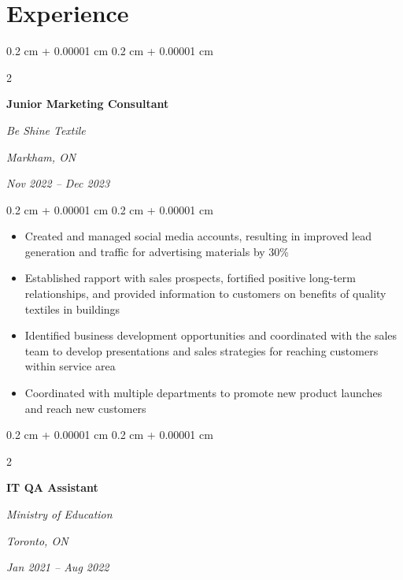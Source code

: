 \documentclass[10pt, letterpaper]{article}
\newenvironment{highlights}{
    \begin{itemize}[
        topsep=0.10 cm,
        parsep=0.10 cm,
        partopsep=0pt,
        itemsep=0pt,
        leftmargin=0.4 cm + 10pt
    ]
}{
    \end{itemize}
} %
\newenvironment{onecolentry}{
    \begin{adjustwidth}{
        0.2 cm + 0.00001 cm
    }{
        0.2 cm + 0.00001 cm
    }
}{
    \end{adjustwidth}
} %
\newenvironment{twocolentry}[2][]{
    \onecolentry
    \def\secondColumn{#2}
    \setcolumnwidth{\fill, 4.5 cm}
    \begin{paracol}{2}
}{
    \switchcolumn \raggedleft \secondColumn
    \end{paracol}
    \endonecolentry
} %
\begin{document}
    
    \section{Experience}



        
        \begin{twocolentry}{
        \textit{Markham, ON}    
            
        \textit{Nov 2022 – Dec 2023}}
            \textbf{Junior Marketing Consultant}
            
            \textit{Be Shine Textile}
        \end{twocolentry}

        \vspace{0.10 cm}
        \begin{onecolentry}
            \begin{highlights}
                \item Created and managed social media accounts, resulting in improved lead generation and traffic for advertising materials by 30\%
                \item Established rapport with sales prospects, fortified positive long-term relationships, and provided information to customers on benefits of quality textiles in buildings
                \item Identified business development opportunities and coordinated with the sales team to develop presentations and sales strategies for reaching customers within service area
                \item Coordinated with multiple departments to promote new product launches and reach new customers
            \end{highlights}
        \end{onecolentry}


        \vspace{0.2 cm}

        \begin{twocolentry}{
        \textit{Toronto, ON}    
            
        \textit{Jan 2021 – Aug 2022}}
            \textbf{IT QA Assistant}
            
            \textit{Ministry of Education}
        \end{twocolentry}
\end{document}
